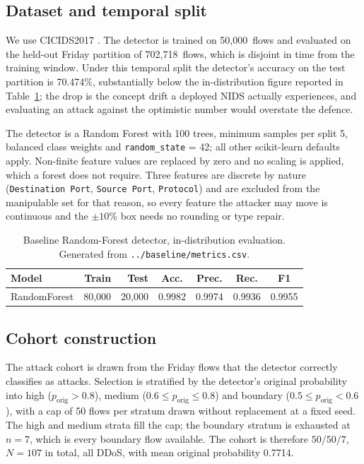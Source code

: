 \documentclass[journal]{IEEEtran}
\providecommand{\citep}[1]{\cite{#1}}
\theoremstyle{definition}
\newcommand{\Ntotal}{107}
\newcommand{\budgetpct}{10}
\newcommand{\testacc}{70.474}
\newcommand{\trainrows}{50{,}000}
\newcommand{\testrows}{702{,}718}
\newcommand{\porig}{0.7714}
\newcommand{\Shighn}{50}
\newcommand{\Smedn}{50}
\newcommand{\Sboundn}{7}
\newcommand{\RFtrees}{100}
\newcommand{\RFsplit}{5}
\newcommand{\RFseed}{42}
\newcommand{\Nperstratum}{50}
\begin{document}
\subsection{Dataset and temporal split}
We use CICIDS2017 \citep{sharafaldin2018cicids}. The detector is trained on
\trainrows\ flows and evaluated on the held-out Friday partition of
\testrows\ flows, which is disjoint in time from the training window. Under this
temporal split the detector's accuracy on the test partition is \testacc\%,
substantially below the in-distribution figure reported in
Table~\ref{tab:baseline}; the drop is the concept drift a deployed NIDS actually
experiences, and evaluating an attack against the optimistic number would
overstate the defence.

The detector is a Random Forest with \RFtrees{} trees, minimum samples per split
\RFsplit{}, balanced class weights and \texttt{random\_state} = \RFseed{}; all
other scikit-learn defaults apply. Non-finite feature values are replaced by
zero and no scaling is applied, which a forest does not require. Three features
are discrete by nature (\texttt{Destination Port}, \texttt{Source Port},
\texttt{Protocol}) and are excluded from the manipulable set for that reason, so
every feature the attacker may move is continuous and the $\pm\budgetpct$\% box
needs no rounding or type repair.

\begin{table}[t]
\caption{Baseline Random-Forest detector, in-distribution evaluation.
Generated from \texttt{.\allowbreak{}.\allowbreak{}/\allowbreak{}baseline/\allowbreak{}metrics.\allowbreak{}csv}.}
\label{tab:baseline}
\centering
\footnotesize
\setlength{\tabcolsep}{3.5pt}
\begin{tabular}{lrrcccc}
\toprule
Model & Train & Test & Acc. & Prec. & Rec. & F1 \\
\midrule
RandomForest & 80{,}000 & 20{,}000 & 0.9982 & 0.9974 & 0.9936 & 0.9955 \\
\bottomrule
\end{tabular}
\end{table}

\subsection{Cohort construction}
The attack cohort is drawn from the Friday flows that the detector correctly
classifies as attacks. Selection is stratified by the detector's original
probability into high ($p_{\text{orig}}>0.8$), medium
($0.6 \le p_{\text{orig}} \le 0.8$) and boundary
($0.5 \le p_{\text{orig}} < 0.6$), with a cap of \Nperstratum{} flows per
stratum drawn without replacement at a fixed seed. The high and medium strata
fill the cap; the boundary stratum is exhausted at $n=\Sboundn$, which is every
boundary flow available. The cohort is therefore $\Shighn/\Smedn/\Sboundn$,
$N=\Ntotal$ in total, all DDoS, with mean original probability \porig.
\end{document}
